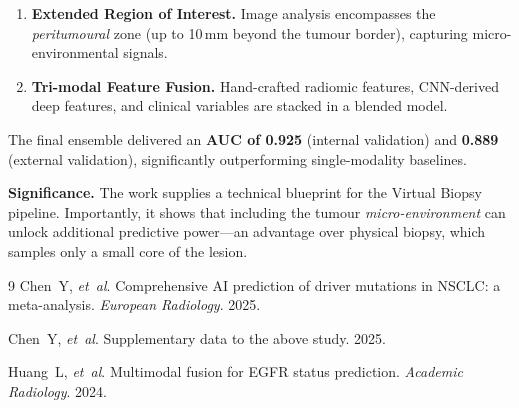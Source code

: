 \documentclass[11pt,a4paper]{article}
\begin{document}
\begin{enumerate}[itemsep=2pt]
  \item \textbf{Extended Region of Interest.}  
        Image analysis encompasses the \emph{peritumoural} zone (up to 10\,mm beyond the tumour border), capturing micro-environmental signals.
  \item \textbf{Tri-modal Feature Fusion.}  
        Hand-crafted radiomic features, CNN-derived deep features, and clinical variables are stacked in a blended model.
\end{enumerate}

The final ensemble delivered an \textbf{AUC of 0.925} (internal validation) and \textbf{0.889} (external validation), significantly outperforming single-modality baselines.\cite{Huang2024}

\textbf{Significance.}  
The work supplies a technical blueprint for the Virtual Biopsy pipeline. 
Importantly, it shows that including the tumour \emph{micro-environment} can unlock additional predictive power—an advantage over physical biopsy, which samples only a small core of the lesion.

\begin{thebibliography}{9}
Chen~Y, \textit{et~al}.
Comprehensive AI prediction of driver mutations in NSCLC: a meta-analysis.
\textit{European Radiology}. 2025.

Chen~Y, \textit{et~al}.
Supplementary data to the above study. 2025.

Huang~L, \textit{et~al}.
Multimodal fusion for EGFR status prediction.
\textit{Academic Radiology}. 2024.
\end{thebibliography}
\end{document}
